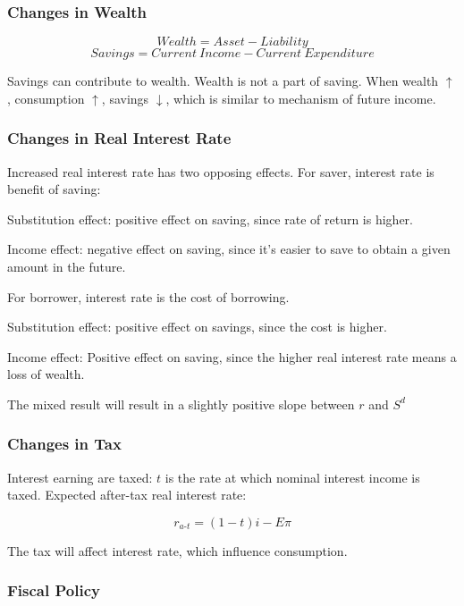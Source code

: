\documentclass[10pt, a4paper]{article}
\begin{document}
                \subsubsection{Changes in Wealth}
                    $$Wealth = Asset - Liability$$
                    $$Savings = Current\ Income - Current\ Expenditure$$

                    Savings can contribute to wealth. Wealth is not a part of saving. When wealth $\uparrow$, consumption $\uparrow$, savings $\downarrow$, which is similar to mechanism of future income.
                \subsubsection{Changes in Real Interest Rate} 
                    Increased real interest rate has two opposing effects. For saver, interest rate is benefit of saving: 
                    
                    \quad Substitution effect: positive effect on saving, since rate of return is higher. 

                    \quad Income effect: negative effect on saving, since it's easier to save to obtain a given amount in the future.\newline
                    
                    
                    For borrower, interest rate is the cost of borrowing.

                    \quad Substitution effect: positive effect on savings, since the cost is higher. 

                    \quad Income effect: Positive effect on saving, since the higher real interest rate means a loss of wealth.

                    The mixed result will result in a slightly positive slope between $r$ and $S^d$ 
                \subsubsection{Changes in Tax}
                    Interest earning are taxed: $t$ is the rate at which nominal interest income is taxed. Expected after-tax real interest rate: 

                    $$r_{a\text{-}t} = (1 - t)i - E\pi$$

                    The tax will affect interest rate, which influence consumption.
                \subsubsection{Fiscal Policy}
\end{document}
